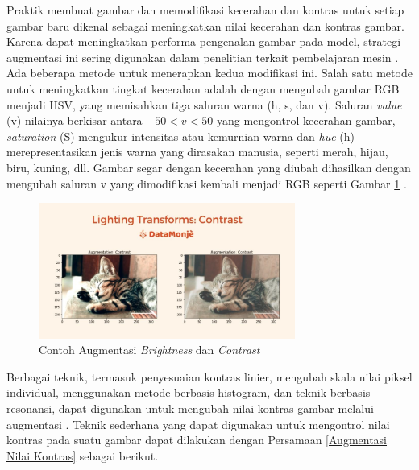     Praktik membuat gambar dan memodifikasi kecerahan dan kontras untuk setiap gambar baru dikenal sebagai meningkatkan nilai kecerahan dan kontras gambar. Karena dapat meningkatkan performa pengenalan gambar pada model, strategi augmentasi ini sering digunakan dalam penelitian terkait pembelajaran mesin \cite{mikolajczyk2018data}\cite{Yang2022}. Ada beberapa metode untuk menerapkan kedua modifikasi ini. Salah satu metode untuk meningkatkan tingkat kecerahan adalah dengan mengubah gambar RGB menjadi HSV, yang memisahkan tiga saluran warna (h, s, dan v). Saluran \textit{value} (v) nilainya berkisar antara $-50 < v < 50$ yang mengontrol kecerahan gambar, \textit{saturation} (S) mengukur intensitas atau kemurnian warna dan \textit{hue} (h) merepresentasikan jenis warna yang dirasakan manusia, seperti merah, hijau, biru, kuning, dll. Gambar segar dengan kecerahan yang diubah dihasilkan dengan mengubah saluran v yang dimodifikasi kembali menjadi RGB seperti Gambar \ref{Contoh Augmentasi Contrast} \cite{oza2020empirical}\cite{Stollnitz1996}.

    \begin{figure}[H]
      \centering
      \includegraphics[width=0.75\textwidth]{figures/bab2/Lighting-Transforms-Contrast-augmentation.jpg}
      \caption{Contoh Augmentasi \textit{Brightness} dan\textit{ Contrast} \cite{anand}}
      \label{Contoh Augmentasi Contrast}

    
     \end{figure} 
    
    Berbagai teknik, termasuk penyesuaian kontras linier, mengubah skala nilai piksel individual, menggunakan metode berbasis histogram, dan teknik berbasis resonansi, dapat digunakan untuk mengubah nilai kontras gambar melalui augmentasi \cite{Bebis2021, Maragatham2015, szeliski2021computer}. Teknik sederhana yang dapat digunakan untuk mengontrol nilai kontras pada suatu gambar dapat dilakukan dengan Persamaan \ref{Augmentasi Nilai Kontras} sebagai berikut.

    
    
